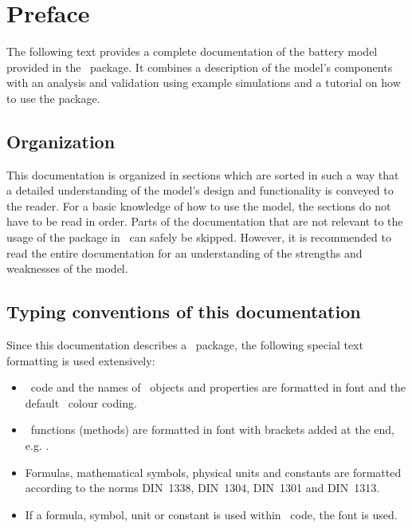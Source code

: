 \section*{Preface}
The following text provides a complete documentation of the battery model provided in the  \matlab\ package. It combines a description of the model's components with an analysis and validation using example simulations and a tutorial on how to use the package.

\subsection*{Organization}
This documentation is organized in sections which are sorted in such a way that a detailed understanding of the model's design and functionality is conveyed to the reader. For a basic knowledge of how to use the model, the sections do not have to be read in order. Parts of the documentation that are not relevant to the usage of the package in \matlab\ can safely be skipped. However, it is recommended to read the entire documentation for an understanding of the strengths and weaknesses of the model.

\subsection*{Typing conventions of this documentation}
Since this documentation describes a \matlab\ package, the following special text formatting is used extensively:
\begin{itemize}
	\item \matlab\ code and the names of \matlab\ objects and properties are formatted in  font and the default \matlab\ colour coding.
	\item \matlab\ functions (methods) are formatted in  font with brackets added at the end, e.g. .
	\item Formulas, mathematical symbols, physical units and constants are formatted according to the norms DIN~1338, DIN~1304, DIN~1301 and DIN~1313.
	\item If a formula, symbol, unit or constant is used within \matlab\ code, the  font is used.
\end{itemize}

